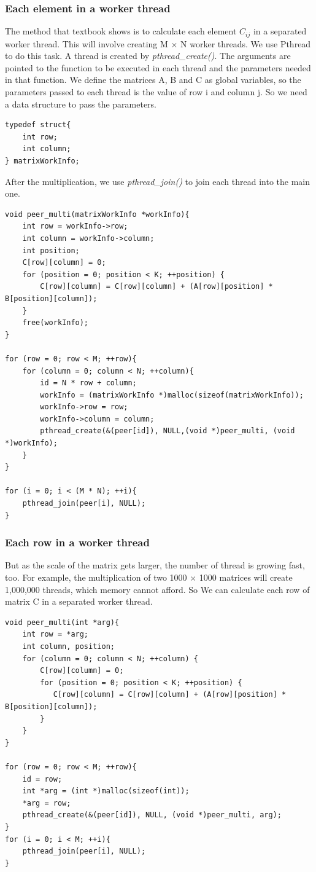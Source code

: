 \documentclass[a4paper, 11pt]{article}
\begin{document}
\subsubsection{Each element in a worker thread}
The method that textbook shows is to calculate each element $C_{ij}$ in a separated worker thread. This will involve creating M $\times$ N worker threads. We use Pthread to do this task. A thread is created by \emph{pthread\_create()}. The arguments are pointed to the function to be executed in each thread and the parameters needed in that function. We define the matrices A, B and C as global variables, so the parameters passed to each thread is the value of row i and column j. So we need a data structure to pass the parameters.
\begin{lstlisting}
typedef struct{
    int row;
    int column;
} matrixWorkInfo;
\end{lstlisting}
After the multiplication, we use \emph{pthread\_join()} to join each thread into the main one.
\begin{lstlisting}
void peer_multi(matrixWorkInfo *workInfo){
    int row = workInfo->row;
    int column = workInfo->column;
    int position;
    C[row][column] = 0;
    for (position = 0; position < K; ++position) {
        C[row][column] = C[row][column] + (A[row][position] * B[position][column]);
    }
    free(workInfo);
}

for (row = 0; row < M; ++row){
    for (column = 0; column < N; ++column){
    	id = N * row + column;
    	workInfo = (matrixWorkInfo *)malloc(sizeof(matrixWorkInfo));
    	workInfo->row = row;
    	workInfo->column = column;
    	pthread_create(&(peer[id]), NULL,(void *)peer_multi, (void *)workInfo);
    }
}

for (i = 0; i < (M * N); ++i){
    pthread_join(peer[i], NULL);
}
\end{lstlisting}
\subsubsection{Each row in a worker thread}
But as the scale of the matrix gets larger, the number of thread is growing fast, too. For example, the multiplication of two 1000 $\times$ 1000 matrices will create 1,000,000 threads, which memory cannot afford. So We can calculate each row of matrix C in a separated worker thread.
\begin{lstlisting}
void peer_multi(int *arg){
    int row = *arg;
    int column, position;
    for (column = 0; column < N; ++column) {
    	C[row][column] = 0;
    	for (position = 0; position < K; ++position) {
    	   C[row][column] = C[row][column] + (A[row][position] * B[position][column]);
    	}
    }
}

for (row = 0; row < M; ++row){
    id = row;
    int *arg = (int *)malloc(sizeof(int));
    *arg = row;
    pthread_create(&(peer[id]), NULL, (void *)peer_multi, arg);
}
for (i = 0; i < M; ++i){
    pthread_join(peer[i], NULL);
}
\end{lstlisting}
\end{document}
